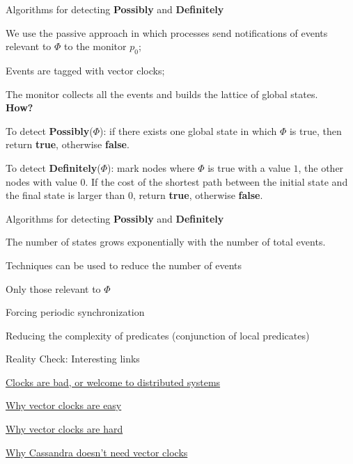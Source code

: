 \begin{frame}{Algorithms for detecting {\bf Possibly} and {\bf Definitely}}

\BI
\item We use the passive approach in which processes send notifications of events 
  relevant to $\Phi$ to the monitor $p_0$;
\item Events are tagged with vector clocks; 
\item The monitor collects all the events and builds the lattice of global
  states.\\
  {\bf How?}
\item To detect {\bf Possibly}($\Phi$): if there exists one 
  global state in which $\Phi$ is true, then return {\bf true}, otherwise
  {\bf false}.
\item To detect {\bf Definitely}($\Phi$): mark nodes where $\Phi$ is true
  with a value $1$, the other nodes with value $0$. If the cost of the 
  shortest path between the initial state and the final state is larger
  than $0$, return {\bf true}, otherwise
  {\bf false}.
\EI

\end{frame}

\begin{frame}{Algorithms for detecting {\bf Possibly} and {\bf Definitely}}

\BIL
\item The number of states grows exponentially with the number of total
  events. 
\item Techniques can be used to reduce the number of events
\BI
\item Only those relevant to $\Phi$
\item Forcing periodic synchronization
\item Reducing the complexity of predicates (conjunction of local predicates)
\EI
\EIL

\end{frame}

\nocite{ozalp93consistent}


\ReadingMaterial

\begin{PlainFrame}{Reality Check: Interesting links}
\BI
\item \href{http://basho.com/clocks-are-bad-or-welcome-to-distributed-systems/}{Clocks are bad, or welcome to distributed systems}
\item \href{http://basho.com/why-vector-clocks-are-easy/}{Why vector clocks are easy}
\item \href{http://basho.com/why-vector-clocks-are-hard/}{Why vector clocks are hard}
\item \href{http://www.datastax.com/dev/blog/why-cassandra-doesnt-need-vector-clocks}{Why Cassandra doesn't need vector clocks}
\EI
\end{PlainFrame}



